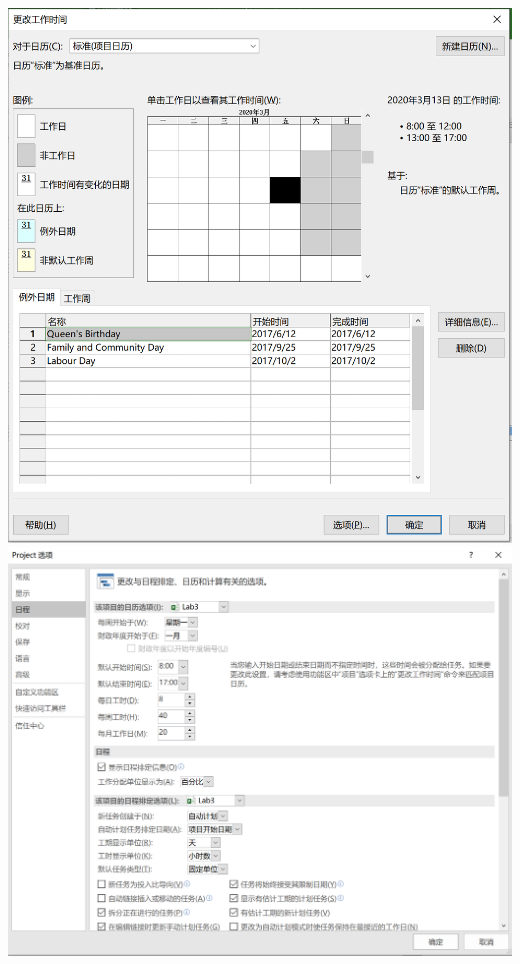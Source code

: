 \documentclass[11pt]{article}
\begin{document}
\includegraphics[scale=0.55]{holiday.png}
\includegraphics[scale=0.55]{settings.png}
\end{document}
